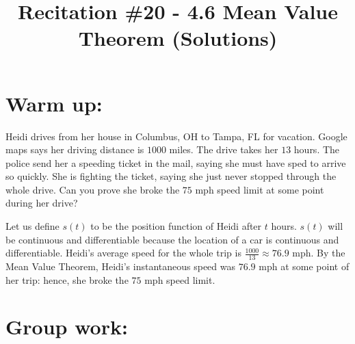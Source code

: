 \documentclass[nooutcomes]{ximera}
\title{Recitation \#20 - 4.6 Mean Value Theorem (Solutions)}
\begin{document}
\begin{abstract}		\end{abstract}
\maketitle

\section*{Warm up:} 
Heidi drives from her house in Columbus, OH to Tampa, FL for vacation.  Google maps says her driving distance is $1000$ miles.  The drive takes her $13$ hours.  The police send her a speeding ticket in the mail, saying she must have sped to arrive so quickly.  She is fighting the ticket, saying she just never stopped through the whole drive.  Can you prove she broke the $75$ mph speed limit at some point during her drive? 
		\begin{freeResponse}
		Let us define $s(t)$ to be the position function of Heidi after $t$ hours.  $s(t)$ will be continuous and differentiable because the location of a car is continuous and differentiable.  Heidi’s average speed for the whole trip is $\frac{1000}{13}\approx 76.9$ mph.  By the Mean Value Theorem, Heidi’s instantaneous speed was $76.9$ mph at some point of her trip: hence, she broke the $75$ mph speed limit.  
		\end{freeResponse}	
		
		
		

	
	
	
	
	

\section*{Group work:}
\end{document}

